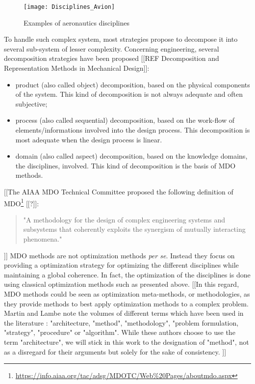 \begin{figure}
\centering
\texttt{[image: Disciplines\_Avion]}
\caption{Examples of aeronautics disciplines}
\label{aero-disc}
\end{figure}

To handle such complex system, most strategies propose to decompose it into several sub-system of lesser complexity. Concerning engineering, several decomposition strategies have been proposed [[REF Decomposition and Representation Methods in Mechanical Design]]:

\begin{itemize}
\item product (also called object) decomposition, based on the physical components of the system. This kind of decomposition is not always adequate and often subjective;
\item process  (also called sequential) decomposition, based on the work-flow of elements/informations involved into the design process. This decomposition is most adequate when the design process is linear.
\item domain (also called aspect) decomposition, based on the knowledge domains, the disciplines, involved. This kind of decomposition is the basis of MDO methods.
\end{itemize}

[[The AIAA MDO Technical Committee proposed the following definition of MDO\footnote{\url{https://info.aiaa.org/tac/adsg/MDOTC/Web\%20Pages/aboutmdo.aspx}} [[\cite{american1991current}?]]:
 \begin{quote}
"A methodology for the design of complex engineering systems and subsystems that coherently exploits the synergism of mutually interacting phenomena."
\end{quote}]]
MDO methods are not optimization methods \emph{per se}. Instead they focus on providing a optimization strategy for optimizing the different disciplines while maintaining a global coherence. In fact, the optimization of the disciplines is done using classical optimization methods such as presented above. [[In this regard, MDO methods could be seen as optimization meta-methods, or methodologies, as they provide methods to best apply optimization methods to a complex problem. Martin and Lambe\cite{Lambe:2011:A} note the volumes of different terms which have been used in the literature :  "architecture, "method", "methodology", "problem formulation, "strategy", "procedure" or "algorithm". While these authors choose to use the term "architecture", we will stick in this work to the designation of "method", not as a disregard for their arguments but solely for the sake of  consistency.  ]] 

